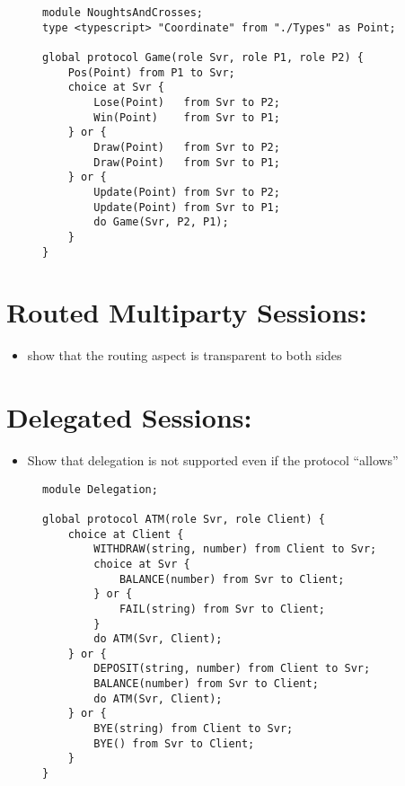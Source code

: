 \begin{figure}[!ht]
\begin{lstlisting}[language=Scribble, tabsize=2]
module NoughtsAndCrosses;
type <typescript> "Coordinate" from "./Types" as Point;

global protocol Game(role Svr, role P1, role P2) {
	Pos(Point) from P1 to Svr;
	choice at Svr {
		Lose(Point)   from Svr to P2;
		Win(Point)    from Svr to P1;
	} or {
		Draw(Point)   from Svr to P2;
		Draw(Point)   from Svr to P1;
	} or {
		Update(Point) from Svr to P2;
		Update(Point) from Svr to P1;
		do Game(Svr, P2, P1);
	}
}
\end{lstlisting}
\label{lst:game}
\end{figure}

\section{Routed Multiparty Sessions: }
\begin{itemize}
\item show that the routing aspect is transparent to both sides
\end{itemize}

\section{Delegated Sessions: }
\label{section:evalatm}

\begin{itemize}
\item Show that delegation is not supported
even if the protocol ``allows''
\end{itemize}

\begin{figure}[!ht]
\begin{lstlisting}[language=Scribble, tabsize=2]
module Delegation;

global protocol ATM(role Svr, role Client) {
	choice at Client {
		WITHDRAW(string, number) from Client to Svr;
		choice at Svr {
			BALANCE(number) from Svr to Client;		
		} or {
			FAIL(string) from Svr to Client;		
		}
		do ATM(Svr, Client);
	} or {
		DEPOSIT(string, number) from Client to Svr;
		BALANCE(number) from Svr to Client;
		do ATM(Svr, Client);
	} or {
		BYE(string) from Client to Svr;
		BYE() from Svr to Client;	
	}
}
\end{lstlisting}
\label{lst:atm}
\end{figure}

